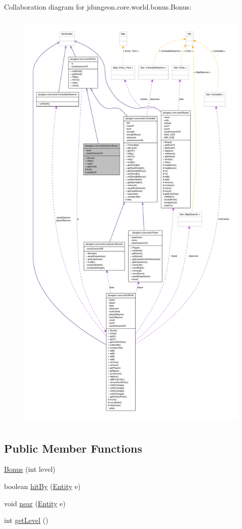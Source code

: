 Collaboration diagram for jdungeon.core.world.bonus.Bonus:
\nopagebreak
\begin{figure}[H]
\begin{center}
\leavevmode
\includegraphics[height=600pt]{classjdungeon_1_1core_1_1world_1_1bonus_1_1_bonus__coll__graph}
\end{center}
\end{figure}
\subsection*{Public Member Functions}
\begin{DoxyCompactItemize}
\item 
\hyperlink{classjdungeon_1_1core_1_1world_1_1bonus_1_1_bonus_a95961ff59a30d0186f90c13211965a05}{Bonus} (int level)
\item 
boolean \hyperlink{classjdungeon_1_1core_1_1world_1_1bonus_1_1_bonus_a9684d0e023504c4643c8776d0592a27e}{hitBy} (\hyperlink{classjdungeon_1_1core_1_1world_1_1_entity}{Entity} e)
\item 
void \hyperlink{classjdungeon_1_1core_1_1world_1_1bonus_1_1_bonus_a08c3d899fc2086987da644d425e7edef}{near} (\hyperlink{classjdungeon_1_1core_1_1world_1_1_entity}{Entity} e)
\item 
int \hyperlink{classjdungeon_1_1core_1_1world_1_1bonus_1_1_bonus_a985375c29c8c6ff98721337f6587a691}{getLevel} ()
\end{DoxyCompactItemize}

